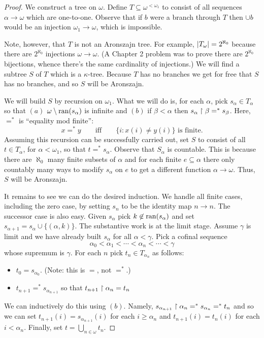 \documentclass[10pt]{amsart}
\begin{document}

\begin{proof}%
We construct a tree on $\omega$. Define $T \subseteq \omega^{<\omega_1}$ to consist of all sequences $\alpha \to \omega$ which are one-to-one. Observe that if $b$ were a branch through $T$ then $\cup b$ would be an injection $\omega_1 \to \omega$, which is impossible. 

Note, however, that $T$ is not an Aronszajn tree. For example, $\left\lvert T_\omega \right\rvert = 2^{\aleph_0}$ because there are $2^{\aleph_0}$ injections $\omega \to \omega$. (A Chapter 2 problem was to prove there are $2^{\aleph_0}$ bijections, whence there's the same cardinality of injections.)
We will find a subtree $S$ of $T$ which is a $\kappa$-tree. Because $T$ has no branches we get for free that $S$ has no branches, and so $S$ will be Aronszajn.

We will build $S$ by recursion on $\omega_1$. What we will do is, for each $\alpha$, pick $s_\alpha \in T_\alpha$ so that $(a)$ $\omega \setminus \operatorname{ran}(s_\alpha)$ is infinite and $(b)$ if $\beta < \alpha$ then $s_\alpha \upharpoonright \beta =^* s_\beta$. Here, $=^*$ is ``equality mod finite'':
\[
x =^* y \qquad \text{iff} \qquad \{ i : x(i) \ne y(i) \} \text{ is finite}.
\]
Assuming this recursion can be successfully carried out, set $S$ to consist of all $t \in T_\alpha$, for $\alpha < \omega_1$, so that $t =^* s_\alpha$. Observe that $S_\alpha$ is countable. This is because there are $\aleph_0$ many finite subsets of $\alpha$ and for each finite $e \subseteq \alpha$ there only countably many ways to modify $s_\alpha$ on $e$ to get a different function $\alpha \to \omega$. Thus, $S$ will be Aronszajn.

It remains to see we can do the desired induction. We handle all finite cases, including the zero case, by setting $s_n$ to be the identity map $n \to n$. The successor case is also easy. Given $s_\alpha$ pick $k \not \in \operatorname{ran}(s_\alpha)$ and set $s_{\alpha + 1} = s_\alpha \cup \{(\alpha,k)\}$. The substantive work is at the limit stage. Assume $\gamma$ is limit and we have already built $s_\alpha$ for all $\alpha < \gamma$. Pick a cofinal sequence 
\[
\alpha_0 < \alpha_1 < \cdots < \alpha_n < \cdots < \gamma
\]
whose supremum is $\gamma$. For each $n$ pick $t_n \in T_{\alpha_n}$ as follows:
\begin{itemize}
\item $t_0 = s_{\alpha_0}$. (Note: this is $=$, not $=^*$.)
\item $t_{n+1} =^* s_{\alpha_{n+1}}$ so that $t_{n+1} \upharpoonright \alpha_n = t_n$
\end{itemize}
We can inductively do this using $(b)$. Namely, $s_{\alpha_{n+1}} \upharpoonright \alpha_n =^* s_{\alpha_n} =^* t_n$ and so we can set $t_{n+1}(i) = s_{\alpha_{n+1}}(i)$ for each $i \ge \alpha_n$ and $t_{n+1}(i) = t_n(i)$ for each $i < \alpha_n$. Finally, set $t = \bigcup_{n \in \omega} t_n$.


\end{proof}
\end{document}
